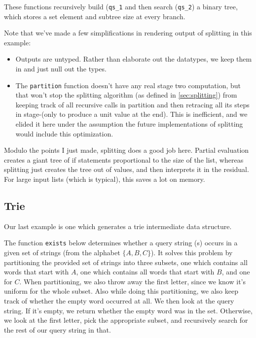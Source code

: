These functions recursively build ({\tt qs\_1} and then search ({\tt qs\_2}) a binary tree,
which stores a set element and subtree size at every branch.

Note that we've made a few simplifications in rendering output of splitting in this example:
\begin{itemize}
\item Outputs are untyped.  Rather than elaborate out the datatypes, we keep them in and just null out the types.
\item The {\tt partition} function doesn't have any real stage two computation,
but that won't stop the splitting algorithm (as defined in \ref{sec:splitting}) from keeping track of all recursive calls in partition 
and then retracing all its steps in stage-\bbtwo (only to produce a unit value at the end).  
This is inefficient, and we elided it here under the assumption the future implementations of splitting would include this optimization.
\end{itemize}

Modulo the points I just made, splitting does a good job here.  
Partial evaluation creates a giant tree of if statements proportional to the size of the list,
whereas splitting just creates the tree out of values, and then interprets it in the residual.
For large input lists (which is typical), this saves a lot on memory.

\subsection{Trie}

Our last example is one which generates a trie intermediate data structure.

The function {\tt exists} below determines whether a query string (s) occurs in a given set of strings (from the alphabet $\{A, B,C\}$).
It solves this problem by partitioning the provided set of strings into three subsets,
one which contains all words that start with $A$,
one which contains all words that start with $B$, and one for $C$.
When partitioning, we also throw away the first letter, since we know it's uniform for the whole subset.
Also while doing this partitioning, we also keep track of whether the empty word occurred at all.
We then look at the query string.  If it's empty, we return whether the empty word was in the set.
Otherwise, we look at the first letter, pick the appropriate subset, 
and recursively search for the rest of our query string in that.

